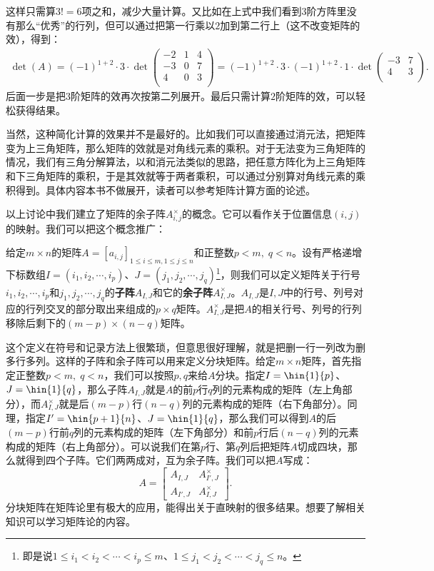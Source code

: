 \documentclass[12pt,UTF8]{ctexbook}
\begin{document}
这样只需算$3! = 6$项之和，减少大量计算。又比如在上式中我们看到$3$阶方阵里没有那么“优秀”的行列，但可以通过把第一行乘以$2$加到第二行上（这不改变矩阵的效），得到：
\begin{align*}
    \det(A) = (-1)^{1+2} \cdot 3\cdot \det\begin{pmatrix}
        -2      & 1 & 4 \\
        -3       & 0 & 7  \\
        4       & 0 & 3 \\
       \end{pmatrix} = (-1)^{1+2} \cdot 3\cdot (-1)^{1+2} \cdot 1\cdot \det\begin{pmatrix}
        -3  & 7  \\
        4   & 3 \\
       \end{pmatrix}.
\end{align*}
后面一步是把$3$阶矩阵的效再次按第二列展开。最后只需计算$2$阶矩阵的效，可以轻松获得结果。

当然，这种简化计算的效果并不是最好的。比如我们可以直接通过消元法，把矩阵变为上三角矩阵，那么矩阵的效就是对角线元素的乘积。对于无法变为三角矩阵的情况，我们有三角分解算法，以和消元法类似的思路，把任意方阵化为上三角矩阵和下三角矩阵的乘积，于是其效就等于两者乘积，可以通过分别算对角线元素的乘积得到。具体内容本书不做展开，读者可以参考矩阵计算方面的论述。

以上讨论中我们建立了矩阵的余子阵$A_{i,j}^{\times}$的概念。它可以看作关于位置信息$(i,j)$的映射。我们可以把这个概念推广：
\begin{df}
    给定$m\times n$的矩阵$A = [a_{i,j}]_{1\leqslant i\leqslant m,1\leqslant j\leqslant n}$和正整数$p< m, \;q< n$。设有严格递增下标数组$I=(i_1,i_2,\cdots,i_p)$、$J=(j_1,j_2,\cdots,j_q)$\footnote{即是说$1\leqslant i_1<i_2<\cdots<i_p\leqslant m$、$1\leqslant j_1<j_2<\cdots<j_q\leqslant n$。}，则我们可以定义矩阵关于行号$i_1,i_2,\cdots,i_p$和$j_1,j_2,\cdots,j_q$的\textbf{子阵}$A_{I,J}$和它的\textbf{余子阵}$A_{I,J}^{\times}$。$A_{I,J}$是$I,J$中的行号、列号对应的行列交叉的部分取出来组成的$p\times q$矩阵。$A_{I,J}^{\times}$是把$A$的相关行号、列号的行列移除后剩下的$(m-p)\times(n-q)$矩阵。
\end{df}
这个定义在符号和记录方法上很繁琐，但意思很好理解，就是把删一行一列改为删多行多列。这样的子阵和余子阵可以用来定义分块矩阵。给定$m\times n$矩阵，首先指定正整数$p< m, \;q< n$，我们可以按照$p,q$来给$A$分块。指定$I=\hin{1}{p}$、$J=\hin{1}{q}$，那么子阵$A_{I,J}$就是$A$的前$p$行$q$列的元素构成的矩阵（左上角部分），而$A_{I,J}^{\times}$就是后$(m-p)$行$(n-q)$列的元素构成的矩阵（右下角部分）。同理，指定$I'=\hin{p+1}{n}$、$J=\hin{1}{q}$，那么我们可以得到$A$的后$(m-p)$行前$q$列的元素构成的矩阵（左下角部分）和前$p$行后$(n-q)$列的元素构成的矩阵（右上角部分）。可以说我们在第$p$行、第$q$列后把矩阵$A$切成四块，那么就得到四个子阵。它们两两成对，互为余子阵。我们可以把$A$写成：
$$
A = \begin{bmatrix}
    A_{I,J} & A_{I',J}^{\times} \\ A_{I',J} &  A_{I,J}^{\times}
\end{bmatrix}.
$$
分块矩阵在矩阵论里有极大的应用，能得出关于直映射的很多结果。想要了解相关知识可以学习矩阵论的内容。
\end{document}
